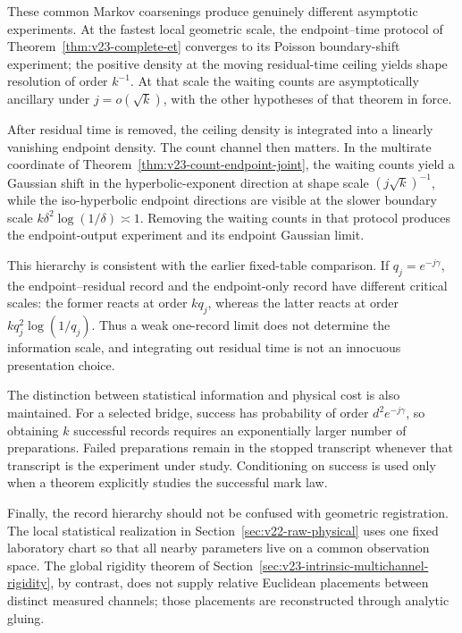 These common Markov coarsenings produce genuinely different asymptotic
experiments.  At the fastest local geometric scale, the endpoint--time
protocol of Theorem~\ref{thm:v23-complete-et} converges to its Poisson
boundary-shift experiment; the positive density at the moving residual-time
ceiling yields shape resolution of order \(k^{-1}\).  At that scale the
waiting counts are asymptotically ancillary under \(j=o(\sqrt k)\), with the
other hypotheses of that theorem in force.

After residual time is removed, the ceiling density is integrated into a
linearly vanishing endpoint density.  The count channel then matters.  In the
multirate coordinate of Theorem~\ref{thm:v23-count-endpoint-joint}, the waiting
counts yield a Gaussian shift in the hyperbolic-exponent direction at shape
scale \((j\sqrt k)^{-1}\), while the iso-hyperbolic endpoint directions are
visible at the slower boundary scale
\(k\delta^2\log(1/\delta)\asymp1\).  Removing the waiting counts in that
protocol produces the endpoint-output experiment and its endpoint Gaussian
limit.

This hierarchy is consistent with the earlier fixed-table comparison.  If
\(q_j=e^{-j\gamma}\), the endpoint--residual record and the endpoint-only
record have different critical scales: the former reacts at order \(kq_j\),
whereas the latter reacts at order
\(kq_j^2\log(1/q_j)\).  Thus a weak one-record limit does not determine the
information scale, and integrating out residual time is not an innocuous
presentation choice.

The distinction between statistical information and physical cost is also
maintained.  For a selected bridge, success has probability of order
\(d^2e^{-j\gamma}\), so obtaining \(k\) successful records requires an
exponentially larger number of preparations.  Failed preparations remain in
the stopped transcript whenever that transcript is the experiment under
study.  Conditioning on success is used only when a theorem explicitly
studies the successful mark law.

Finally, the record hierarchy should not be confused with geometric
registration.  The local statistical realization in
Section~\ref{sec:v22-raw-physical} uses one fixed laboratory chart so that all
nearby parameters live on a common observation space.  The global rigidity
theorem of Section~\ref{sec:v23-intrinsic-multichannel-rigidity}, by contrast,
does not supply relative Euclidean placements between distinct measured
channels; those placements are reconstructed through analytic gluing.


